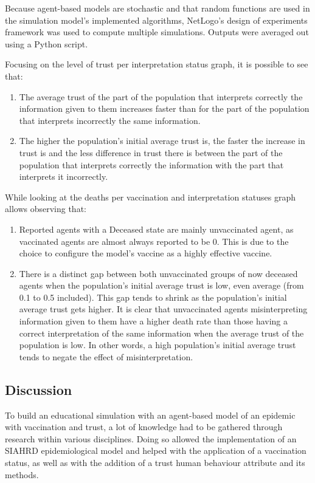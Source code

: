 Because agent-based models are stochastic and that random functions are used in the simulation model’s implemented algorithms, NetLogo's design of experiments framework was used to compute multiple simulations. Outputs were averaged out using a Python script.

Focusing on the level of trust per interpretation status graph, it is possible to see that:
\begin{enumerate}
    \item The average trust of the part of the population that interprets correctly the information given to them increases faster than for the part of the population that interprets incorrectly the same information.
    \item The higher the population's initial average trust is, the faster the increase in trust is and the less difference in trust there is between the part of the population that interprets correctly the information with the part that interprets it incorrectly.
\end{enumerate}

While looking at the deaths per vaccination and interpretation statuses graph allows observing that:
\begin{enumerate}
    \item Reported agents with a Deceased state are mainly unvaccinated agent, as vaccinated agents are almost always reported to be 0. This is due to the choice to configure the model's vaccine as a highly effective vaccine.
    \item There is a distinct gap between both unvaccinated groups of now deceased agents when the population's initial average trust is low, even average (from 0.1 to 0.5 included). This gap tends to shrink as the population's initial average trust gets higher. It is clear that unvaccinated agents misinterpreting information given to them have a higher death rate than those having a correct interpretation of the same information when the average trust of the population is low. In other words, a high population's initial average trust tends to negate the effect of misinterpretation.
\end{enumerate}

\subsection{Discussion}

To build an educational simulation with an agent-based model of an epidemic with vaccination and trust, a lot of knowledge had to be gathered through research within various disciplines. Doing so allowed the implementation of an SIAHRD epidemiological model and helped with the application of a vaccination status, as well as with the addition of a trust human behaviour attribute and its methods.


